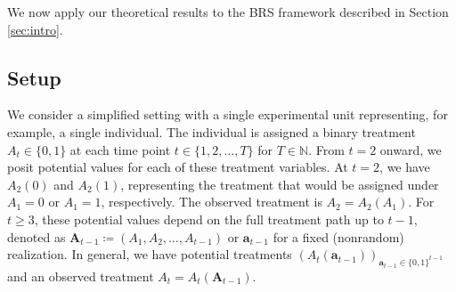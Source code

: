 \documentclass[11pt]{article}
\renewcommand\vec[1]{\boldsymbol{#1}}
\newcommand{\N}{\mathbb{N}}
\theoremstyle{definition}
\begin{document}
We now apply our theoretical results to the BRS framework described in Section \ref{sec:intro}.

\subsection{Setup}\label{sec:application-setup}

We consider a simplified setting with a single experimental unit representing, for example, a single individual.
The individual is assigned a binary treatment $A_t \in \{0, 1\}$ at each time point $t \in \{1, 2, \ldots, T\}$ for $T \in \N$.
From $t = 2$ onward, we posit potential values \citep{rubin_estimating_1974} for each of these treatment variables.
At $t = 2$, we have $A_2(0)$ and $A_2(1)$, representing the treatment that would be assigned under $A_1 = 0$ or $A_1 = 1$, respectively.
The observed treatment is $A_2 = A_2(A_1)$.
For $t \geq 3$, these potential values depend on the full treatment path up to $t-1$, denoted as $\vec{A}_{t-1} \coloneqq (A_1, A_2, \ldots, A_{t-1})$ or $\vec{a}_{t-1}$ for a fixed (nonrandom) realization.
In general, we have potential treatments $(A_t(\vec{a}_{t-1}))_{\vec{a}_{t-1} \in \{0, 1\}^{t-1}}$ and an observed treatment $A_t = A_t(\vec{A}_{t-1})$.
\end{document}
